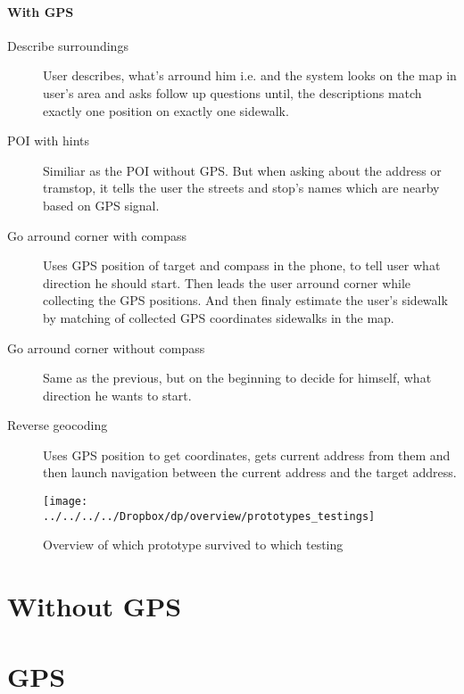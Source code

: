 \documentclass[11pt,oneside,a4paper]{book}
\begin{document}
			\paragraph{With GPS}
				\begin{description}
					\item [Describe surroundings]
						User describes, what's arround him i.e.  and the system looks on the map in user's area and asks follow up questions until, the descriptions match exactly one position on exactly one sidewalk.								
					\item [POI with hints]
						Similiar as the POI without GPS. But when asking about the address or tramstop, it tells the user the streets and stop's names which are nearby based on GPS signal.
					\item [Go arround corner with compass]
						Uses GPS position of target and compass in the phone, to tell user what direction he should start. Then leads the user arround corner while collecting the GPS positions. And then finaly estimate the user's sidewalk by matching of collected GPS coordinates sidewalks in the map.
					\item [Go arround corner without compass]
						Same as the previous, but on the beginning to decide for himself, what direction he wants to start.
					\item [Reverse geocoding]
						Uses GPS position to get coordinates, gets current address from them and then launch navigation between the current address and the target address.
				\end{description}
			
				
				\begin{figure}
					\centering
					\texttt{[image: ../../../../Dropbox/dp/overview/prototypes\_testings]}
					\caption{Overview of which prototype survived to which testing}
					\label{fig:prototypestestings}
				\end{figure}
		\section{Without GPS}
		\section{GPS}
\end{document}
